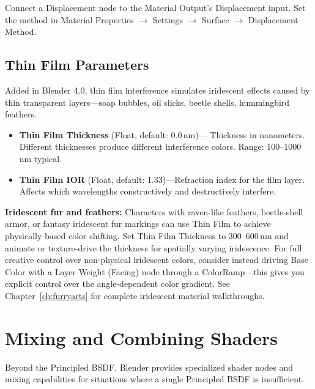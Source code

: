 Connect a Displacement node to the Material Output's Displacement
input. Set the method in Material Properties $\rightarrow$ Settings
$\rightarrow$ Surface $\rightarrow$ Displacement Method.

\subsection{Thin Film Parameters}
\label{sec:shading:principled:thinfilm}

Added in Blender 4.0, thin film interference simulates iridescent
effects caused by thin transparent layers---soap bubbles, oil
slicks, beetle shells, hummingbird feathers.

\begin{itemize}[leftmargin=2em]
  \item \textbf{Thin Film Thickness} (Float, default: 0.0\,nm)---
        Thickness in nanometers. Different thicknesses produce
        different interference colors. Range: 100--1000\,nm typical.
  \item \textbf{Thin Film IOR} (Float, default: 1.33)---Refraction
        index for the film layer. Affects which wavelengths
        constructively and destructively interfere.
\end{itemize}

\begin{furrybox}
\textbf{Iridescent fur and feathers:} Characters with raven-like
feathers, beetle-shell armor, or fantasy iridescent fur markings
can use Thin Film to achieve physically-based color shifting. Set
Thin Film Thickness to 300--600\,nm and animate or texture-drive
the thickness for spatially varying iridescence. For full creative
control over non-physical iridescent colors, consider instead
driving Base Color with a Layer Weight (Facing) node through a
ColorRamp---this gives you explicit control over the
angle-dependent color gradient. See Chapter~\ref{ch:furryarts}
for complete iridescent material walkthroughs.
\end{furrybox}


\section{Mixing and Combining Shaders}
\label{sec:shading:mixing}

Beyond the Principled BSDF, Blender provides specialized shader
nodes and mixing capabilities for situations where a single
Principled BSDF is insufficient.

